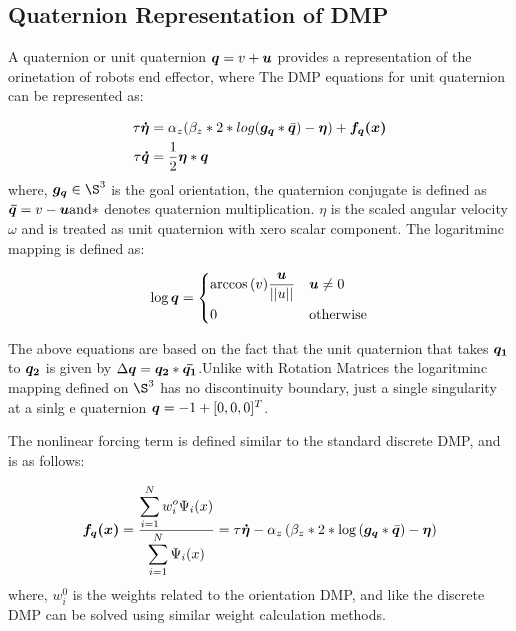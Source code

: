 \subsection{Quaternion Representation of DMP}
A quaternion or unit quaternion $\boldsymbol{q} = v + \boldsymbol{u}$ provides a representation of the orinetation of robots end effector, where The DMP equations for unit quaternion can be represented as:

\begin{align}
    \tau \boldsymbol{\dot{\eta}} &= \alpha_z(\beta_z * 2 * log(\boldsymbol{g_q} * \bar{\boldsymbol{q}}) - \boldsymbol{\eta}) + \boldsymbol{f_q(x)} \\
    \tau \boldsymbol{\dot{q}} &= \frac{1}{2} \boldsymbol{\eta} * \boldsymbol{q}
\end{align}
where, $\vect{g_q} \in \S^3 $ is the goal orientation, the quaternion conjugate is defined as $\boldsymbol{\bar{q}} = v - \boldsymbol{u}
\text{and} *$ denotes quaternion multiplication. $\eta$ is the scaled angular velocity $\omega$ and is
treated as unit quaternion with xero scalar component. The logaritminc mapping is defined as:

\begin{equation}
\log{\boldsymbol{q}} = 
\begin{dcases}
  \arccos{(v)} \frac{\displaystyle \boldsymbol{u}}{\displaystyle ||u||} &  \boldsymbol{u} \neq 0 \\
  0           &  \text{otherwise} 
\end{dcases}
\end{equation}

The above equations are based on the fact that the unit quaternion that takes $\boldsymbol{q_1}$ to $\boldsymbol{q_2}$
is given by $\Delta \boldsymbol{q} = \boldsymbol{q_2} * \boldsymbol{\bar{q_1}}$.Unlike with Rotation Matrices the logaritminc mapping defined on $\S^3$ has no discontinuity boundary, just a single singularity
at a sinlg e quaternion $\boldsymbol{q} = -1 + [0,0,0]^T $.

The nonlinear forcing term is defined similar to the standard discrete DMP, and is as follows:

\begin{equation}
    \boldsymbol{f_q(x)} = \frac{\displaystyle \sum\limits_{i=1}^{N} w_i^o \Psi_i(x)}{\displaystyle \sum\limits_{i=1}^N \Psi_i(x)} = 
    \tau \boldsymbol{\dot{\eta}} - \alpha_z \left(  \beta_z * 2 * \log{ \left(  \boldsymbol{g_q} * \bar{\boldsymbol{q}}\right) } - \boldsymbol{\eta} \right)
\end{equation}
where, $w_i^0$ is the weights related to the orientation DMP, and like the discrete DMP can be solved using similar weight calculation methods.

